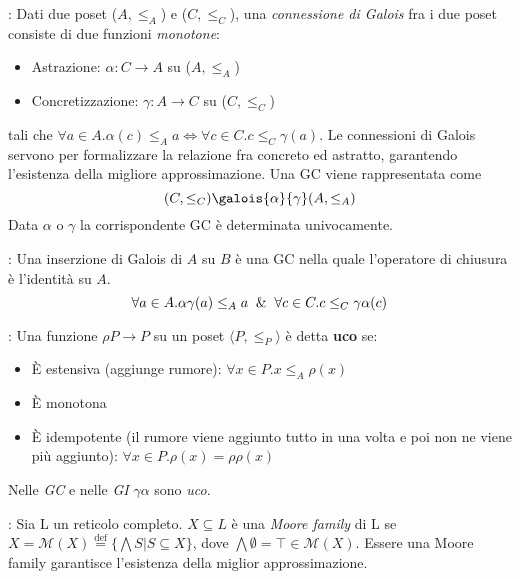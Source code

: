 \documentclass[a4paper,12pt,openany]{article}
\newcommand{\Mmoore}{\mathcal{M}}
\newenvironment{definition}[1][Definizione]{\begin{trivlist}
\item[\hskip \labelsep {\bfseries #1}]}{\end{trivlist}}
\begin{document}
    \begin{definition}[Galois connections]: Dati due poset ($A, \leq_A$) e ($C, \leq_C$), una 
        \emph{connessione di Galois} fra i due poset consiste di due funzioni \emph{monotone}:
        \begin{itemize}
            \item Astrazione: $\alpha : C \to A$ su ($A, \leq_A$)
            \item Concretizzazione: $\gamma : A \to C$ su ($C, \leq_C$)
        \end{itemize}
            tali che $\forall a \in A.\alpha(c) \leq_A a \Leftrightarrow \forall c \in C.c \leq_C \gamma(a)$.
            Le connessioni di Galois servono per formalizzare la relazione fra concreto ed astratto, garantendo
            l'esistenza della migliore approssimazione. Una GC viene rappresentata come
            $$(C, \leq_C)\galois{\alpha}{\gamma}(A, \leq_A)$$
            Data $\alpha$ o $\gamma$ la corrispondente GC è determinata univocamente.
    \end{definition}
    
    \begin{definition}[Galois insertions]: Una inserzione di Galois di $A$ su $B$ è una GC nella quale l'operatore di
        chiusura è l'identità su $A$.
        $$\forall a \in A.\alpha\gamma(a) \leq_A a \And \forall c \in C.c \leq_C \gamma\alpha(c)$$
        
    \end{definition}
    
    \begin{definition}[Upper closure operators] : Una funzione $\rho P \to P$ su un poset 
        $\langle P, \leq_P \rangle$ è detta \textbf{uco} se:
        \begin{itemize}
            \item È estensiva (aggiunge rumore): $\forall x \in P.x \leq_A \rho(x)$
            \item È monotona
            \item È idempotente (il rumore viene aggiunto tutto in una volta e poi non ne viene più aggiunto):
                $\forall x \in P.\rho(x) = \rho\rho(x)$
        \end{itemize}
        Nelle \emph{GC} e nelle \emph{GI} $\gamma\alpha$ sono \emph{uco}.
    \end{definition}
    
    \begin{definition}[Moore families] : Sia L un reticolo completo. $X \subseteq L$ è una \emph{Moore family}
        di L se $X = \Mmoore(X) \overset{\mathrm{def}}{=} \{\bigwedge S | S \subseteq X\}$, dove 
        $\bigwedge \emptyset = \top \in \Mmoore(X)$. Essere una Moore family garantisce l'esistenza della
        miglior approssimazione.
    \end{definition}
    
\end{document}
